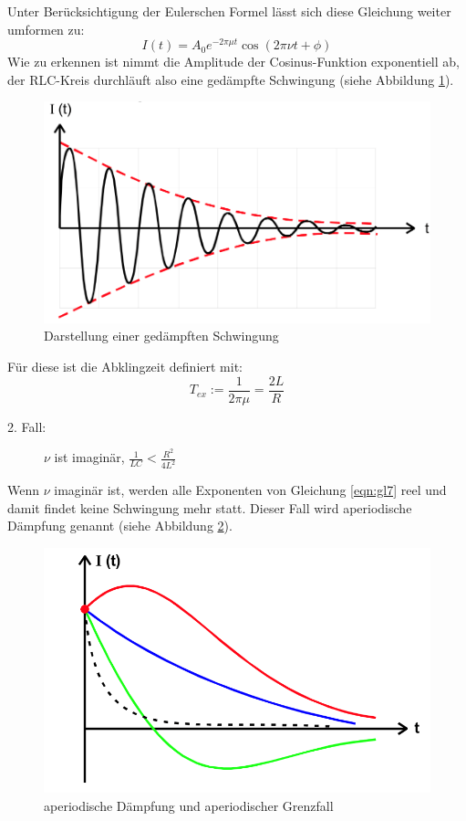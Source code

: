 Unter Berücksichtigung der Eulerschen Formel lässt sich diese Gleichung weiter umformen zu:
\begin{equation}
  I(t) = A_0 e^{-2\pi\mu t}\cos(2\pi\nu t + \phi)
  \label{eqn:gl11}
\end{equation}
Wie zu erkennen ist nimmt die Amplitude der Cosinus-Funktion exponentiell ab, der RLC-Kreis durchläuft also eine gedämpfte Schwingung (siehe Abbildung \ref{fig:abb2}).
\begin{figure}
  \centering
  \includegraphics[width=\textwidth]{abb2.jpg}
  \caption{Darstellung einer gedämpften Schwingung\cite{manualV354}}
  \label{fig:abb2}
\end{figure}
Für diese ist die Abklingzeit definiert mit:
\begin{equation}
  T_{ex} := \frac{1}{2\pi\mu} = \frac{2L}{R}
  \label{eqn:gl12}
\end{equation}
\begin{description}
  \item[2. Fall:] $\nu$ ist imaginär, $\frac{1}{LC} < \frac{R^2}{4L^2}$
\end{description}
Wenn $\nu$ imaginär ist, werden alle Exponenten von Gleichung \eqref{eqn:gl7} reel und damit findet keine Schwingung mehr statt.
Dieser Fall wird aperiodische Dämpfung genannt (siehe Abbildung \ref{fig:abb3}).
\begin{figure}
  \centering
  \includegraphics[width=\textwidth]{abb3.jpg}
  \caption{aperiodische Dämpfung und aperiodischer Grenzfall\cite{manualV354}}
  \label{fig:abb3}
\end{figure}
